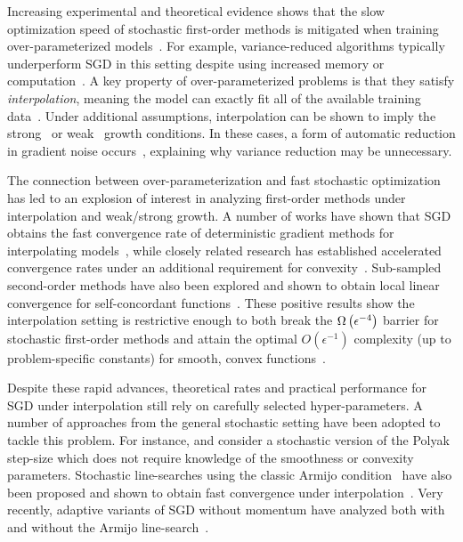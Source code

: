 Increasing experimental and theoretical evidence shows that the slow optimization speed of stochastic first-order methods is mitigated when training over-parameterized models~\citep{ma2018power, arora2018overparameterization, zhou2019analysis}.
For example, variance-reduced algorithms typically underperform \ac{SGD} in this setting despite using increased memory or computation~\citep{defazio2019effectiveness, ma2018power}. 
A key property of over-parameterized problems is that they satisfy \emph{interpolation}, meaning the model can exactly fit all of the available training data~\citep{belkin2019reconciling, belkin2019datainterp, schapire1997boosting}.
Under additional assumptions, interpolation can be shown to imply the strong~\citep{solodov1998incremental, tseng1998incremental, schmidt2013fast} or weak~\citep{vaswani2019fast, bassily2018exponential} growth conditions. 
In these cases, a form of automatic reduction in gradient noise occurs~\citep{liu2020accelerating}, explaining why variance reduction may be unnecessary. 

The connection between over-parameterization and fast stochastic optimization has led to an explosion of interest in analyzing first-order methods under interpolation and weak/strong growth.
A number of works have shown that \ac{SGD} obtains the fast convergence rate of deterministic gradient methods for interpolating models~\citep{schmidt2013fast, bassily2018exponential, vaswani2019fast, cevher2018linear, jain2018accelerating}, while closely related research has established accelerated convergence rates under an additional requirement for convexity~\citep{liu2020accelerating, vaswani2019fast, jain2018accelerating}.
Sub-sampled second-order methods have also been explored and shown to obtain local linear convergence for self-concordant functions~\citep{meng2020fastandfurious}.
These positive results show the interpolation setting is restrictive enough to both break the \( \Omega\left(\epsilon^{-4}\right) \) barrier for stochastic first-order methods and attain the optimal \( O(\epsilon^{-1}) \) complexity (up to problem-specific constants) for smooth, convex functions~\cite{nemirovsky1985optimal, arjevani2016iteration}. 

Despite these rapid advances, theoretical rates and practical performance for \ac{SGD} under interpolation still rely on carefully selected hyper-parameters.
A number of approaches from the general stochastic setting have been adopted to tackle this problem.
For instance, \citet{loizou2020sps} and \citet{berrada2019training} consider a stochastic version of the Polyak step-size which does not require knowledge of the smoothness or convexity parameters. 
Stochastic line-searches using the classic Armijo condition~\citep{armijo1966ls} have also been proposed and shown to obtain fast convergence under interpolation~\citep{vaswani2019painless}.
Very recently, adaptive variants of \ac{SGD} without momentum have analyzed both with and without the Armijo line-search~\citep{vaswani2020adaptive}.

